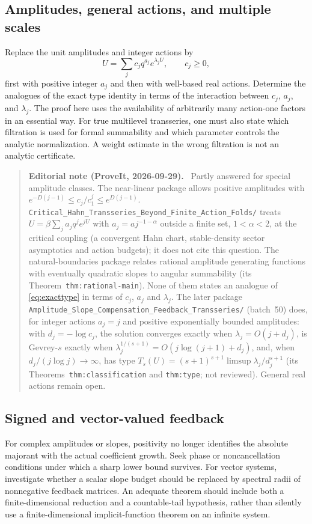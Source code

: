 \documentclass[11pt,a4paper]{article}
\numberwithin{equation}{section}
\theoremstyle{definition}
\theoremstyle{remark}
\newenvironment{ednote}{\par\smallskip\begin{quote}\small\raggedright\textbf{Editorial note (ProveIt, 2026-09-29).}\ }{\end{quote}\smallskip}
\begin{document}
\subsection{Amplitudes, general actions, and multiple scales}
Replace the unit amplitudes and integer actions by
\[
 U=\sum_j c_j q^{a_j}e^{\lambda_j U},
 \qquad c_j\ge0,
\]
first with positive integer $a_j$ and then with well-based real actions.
Determine the analogues of the exact type identity in terms of the
interaction between $c_j$, $a_j$, and $\lambda_j$.  The proof here uses the
availability of arbitrarily many action-one factors in an essential way.
For true multilevel transseries, one must also state which filtration is
used for formal summability and which parameter controls the analytic
normalization.  A weight estimate in the wrong filtration is not an
analytic certificate.
\begin{ednote}
Partly answered for special amplitude classes. The near-linear package
allows positive amplitudes with $e^{-D(j-1)}\le c_j/c_1^j\le e^{D(j-1)}$.
\nolinkurl{Critical_Hahn_Transseries_Beyond_Finite_Action_Folds/}
treats $U=\beta\sum_ja_jq^je^{jU}$ with $a_j=aj^{-1-\alpha}$ outside a
finite set, $1<\alpha<2$, at the critical coupling (a convergent Hahn
chart, stable-density sector asymptotics and action budgets); it does not
cite this question. The natural-boundaries package relates rational
amplitude generating functions with eventually quadratic slopes to angular
summability (its Theorem~\texttt{thm:rational-main}). None of them states an
analogue of \eqref{eq:exacttype} in terms of $c_j$, $a_j$ and $\lambda_j$.
The later package
\nolinkurl{Amplitude_Slope_Compensation_Feedback_Transseries/} (batch~50)
does, for integer actions $a_j=j$ and positive exponentially bounded
amplitudes: with $d_j=-\log c_j$, the solution converges exactly when
$\lambda_j=O(j+d_j)$, is Gevrey-$s$ exactly when
$\lambda_j^{1/(s+1)}=O(j\log(j+1)+d_j)$, and, when $d_j/(j\log j)\to\infty$,
has type $T_s(U)=(s+1)^{s+1}\limsup\lambda_j/d_j^{s+1}$ (its
Theorems~\texttt{thm:classification} and \texttt{thm:type}; not reviewed).
General real actions remain open.
\end{ednote}

\subsection{Signed and vector-valued feedback}
For complex amplitudes or slopes, positivity no longer identifies the
absolute majorant with the actual coefficient growth.  Seek phase or
noncancellation conditions under which a sharp lower bound survives.
For vector systems, investigate whether a scalar slope budget should be
replaced by spectral radii of nonnegative feedback matrices.  An adequate
theorem should include both a finite-dimensional reduction and a
countable-tail hypothesis, rather than silently use a finite-dimensional
implicit-function theorem on an infinite system.
\end{document}
